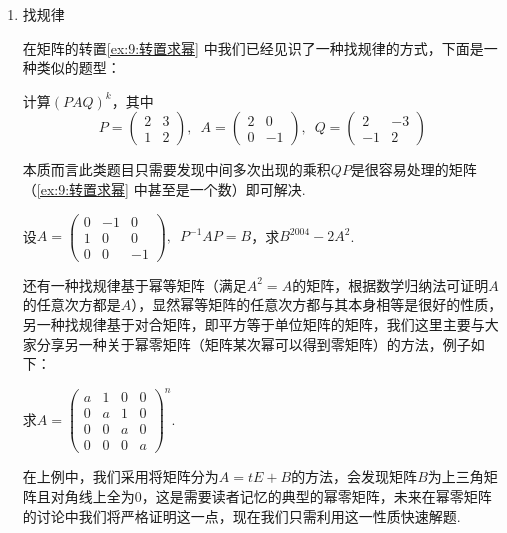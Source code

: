 \begin{enumerate}
    \item 找规律

          在矩阵的转置\autoref{ex:9:转置求幂} 中我们已经见识了一种找规律的方式，下面是一种类似的题型：
          \begin{example}
              计算$(PAQ)^k$，其中
              \[P=\begin{pmatrix}2 & 3 \\ 1 & 2\end{pmatrix},\enspace A=\begin{pmatrix}2 & 0 \\ 0 & -1\end{pmatrix},\enspace Q=\begin{pmatrix}2 & -3 \\ -1 & 2\end{pmatrix}\]
          \end{example}
          本质而言此类题目只需要发现中间多次出现的乘积$QP$是很容易处理的矩阵（\autoref{ex:9:转置求幂} 中甚至是一个数）即可解决.

          \begin{solution}

          \end{solution}

          \begin{example}
              设$A=\begin{pmatrix}0 & -1 & 0 \\ 1 & 0 & 0 \\ 0 & 0 & -1 \end{pmatrix},\enspace P^{-1}AP=B$，求$B^{2004}-2A^2$.
          \end{example}
          \begin{solution}

          \end{solution}

          还有一种找规律基于幂等矩阵（满足$A^2=A$的矩阵，根据数学归纳法可证明$A$的任意次方都是$A$），显然幂等矩阵的任意次方都与其本身相等是很好的性质，另一种找规律基于对合矩阵，即平方等于单位矩阵的矩阵，我们这里主要与大家分享另一种关于幂零矩阵（矩阵某次幂可以得到零矩阵）的方法，例子如下：
          \begin{example}
              求$A=\begin{pmatrix}a & 1 & 0 & 0 \\ 0 & a & 1 & 0 \\ 0 & 0 & a & 0 \\ 0 & 0 & 0 & a \end{pmatrix}^n$.
          \end{example}
          在上例中，我们采用将矩阵分为$A=tE+B$的方法，会发现矩阵$B$为上三角矩阵且对角线上全为0，这是需要读者记忆的典型的幂零矩阵，未来在幂零矩阵的讨论中我们将严格证明这一点，现在我们只需利用这一性质快速解题.


\end{enumerate}
